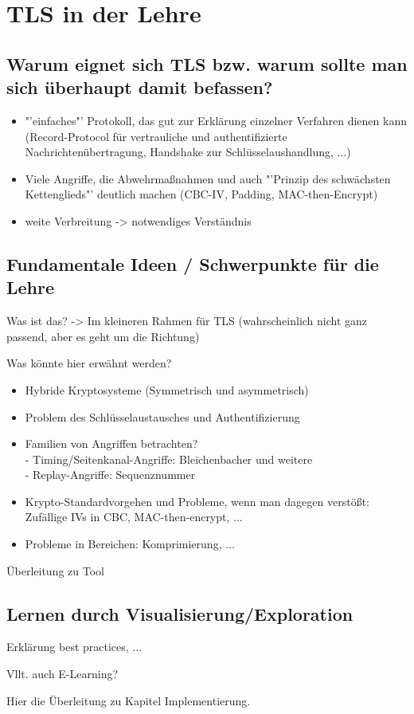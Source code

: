 \chapter{TLS in der Lehre}

\section{Warum eignet sich TLS bzw. warum sollte man sich überhaupt damit befassen?}

\begin{itemize}
	\item "'einfaches"' Protokoll, das gut zur Erklärung einzelner Verfahren dienen kann (Record-Protocol für vertrauliche und authentifizierte Nachrichtenübertragung, Handshake zur Schlüsselaushandlung, ...)
	\item Viele Angriffe, die Abwehrmaßnahmen und auch "'Prinzip des schwächsten Kettenglieds"' deutlich machen (CBC-IV, Padding, MAC-then-Encrypt)
	\item weite Verbreitung -> notwendiges Verständnis
\end{itemize}

\section{Fundamentale Ideen / Schwerpunkte für die Lehre}

Was ist das? -> Im kleineren Rahmen für TLS (wahrscheinlich nicht ganz passend, aber es geht um die Richtung)

Was könnte hier erwähnt werden?

\begin{itemize}
	\item Hybride Kryptosysteme (Symmetrisch und asymmetrisch)
	\item Problem des Schlüsselaustausches und Authentifizierung
	\item Familien von Angriffen betrachten?\\
	- Timing/Seitenkanal-Angriffe: Bleichenbacher und weitere\\
	- Replay-Angriffe: Sequenznummer
	\item Krypto-Standardvorgehen und Probleme, wenn man dagegen verstößt: Zufällige IVs in CBC, MAC-then-encrypt, ...
	\item Probleme in  Bereichen: Komprimierung, ...
\end{itemize}

Überleitung zu Tool

\section{Lernen durch Visualisierung/Exploration}

Erklärung best practices, ...

Vllt. auch E-Learning?

Hier die Überleitung zu Kapitel Implementierung. 